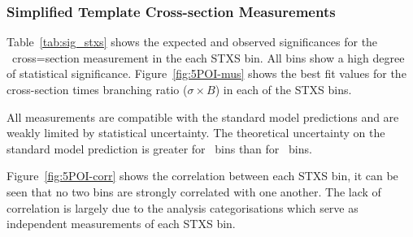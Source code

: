 \subsubsection{Simplified Template Cross-section Measurements}
Table~\ref{tab:sig_stxs} shows the expected and observed significances for
the \VHbb\ cross=section measurement in the each STXS bin. All bins show a high
degree of statistical significance. Figure~\ref{fig:5POI-mus} shows the best fit
values for the cross-section times branching ratio ($\sigma \times B$) in each
of the STXS bins.

All measurements are compatible with the standard model predictions and are
weakly limited by statistical uncertainty. The theoretical uncertainty on the
standard  model prediction is greater for \ZH\ bins than for \WH\ bins.

Figure~\ref{fig:5POI-corr} shows the correlation between each STXS bin, it can
be seen that no two bins are strongly correlated with one another. The lack of
correlation is largely due to the analysis categorisations which serve as
independent measurements of each STXS bin.




